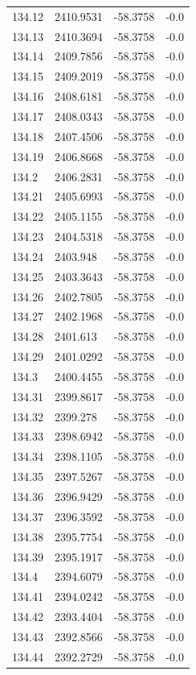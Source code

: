 \begin{table}[H]
\begin{tabular}{llll}
134.12 & 2410.9531 & -58.3758 & -0.0 \\
134.13 & 2410.3694 & -58.3758 & -0.0 \\
134.14 & 2409.7856 & -58.3758 & -0.0 \\
134.15 & 2409.2019 & -58.3758 & -0.0 \\
134.16 & 2408.6181 & -58.3758 & -0.0 \\
134.17 & 2408.0343 & -58.3758 & -0.0 \\
134.18 & 2407.4506 & -58.3758 & -0.0 \\
134.19 & 2406.8668 & -58.3758 & -0.0 \\
134.2 & 2406.2831 & -58.3758 & -0.0 \\
134.21 & 2405.6993 & -58.3758 & -0.0 \\
134.22 & 2405.1155 & -58.3758 & -0.0 \\
134.23 & 2404.5318 & -58.3758 & -0.0 \\
134.24 & 2403.948 & -58.3758 & -0.0 \\
134.25 & 2403.3643 & -58.3758 & -0.0 \\
134.26 & 2402.7805 & -58.3758 & -0.0 \\
134.27 & 2402.1968 & -58.3758 & -0.0 \\
134.28 & 2401.613 & -58.3758 & -0.0 \\
134.29 & 2401.0292 & -58.3758 & -0.0 \\
134.3 & 2400.4455 & -58.3758 & -0.0 \\
134.31 & 2399.8617 & -58.3758 & -0.0 \\
134.32 & 2399.278 & -58.3758 & -0.0 \\
134.33 & 2398.6942 & -58.3758 & -0.0 \\
134.34 & 2398.1105 & -58.3758 & -0.0 \\
134.35 & 2397.5267 & -58.3758 & -0.0 \\
134.36 & 2396.9429 & -58.3758 & -0.0 \\
134.37 & 2396.3592 & -58.3758 & -0.0 \\
134.38 & 2395.7754 & -58.3758 & -0.0 \\
134.39 & 2395.1917 & -58.3758 & -0.0 \\
134.4 & 2394.6079 & -58.3758 & -0.0 \\
134.41 & 2394.0242 & -58.3758 & -0.0 \\
134.42 & 2393.4404 & -58.3758 & -0.0 \\
134.43 & 2392.8566 & -58.3758 & -0.0 \\
134.44 & 2392.2729 & -58.3758 & -0.0 \\

\end{tabular}
\end{table}
